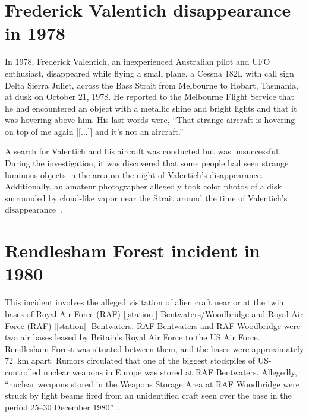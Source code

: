 \section{Frederick Valentich disappearance in 1978}

\label{2023-UFO-chapter-History--1953-2016-vd1978}

In 1978, Frederick Valentich, an inexperienced Australian pilot and UFO enthusiast, disappeared while flying a small plane, a Cessna 182L with call sign Delta Sierra Juliet, across the Bass Strait from Melbourne to Hobart, Tasmania, at dusk on October 21, 1978. He reported to the Melbourne Flight Service that he had encountered an object with a metallic shine and bright lights and that it was hovering above him. His last words were, ``That strange aircraft is hovering on top of me again [[$\ldots$]] and it's not an aircraft.''

A search for Valentich and his aircraft was conducted but was unsuccessful. During the investigation, it was discovered that some people had seen strange luminous objects in the area on the night of Valentich's disappearance. Additionally, an amateur photographer allegedly took color photos of a disk surrounded by cloud-like vapor near the Strait around the time of Valentich's disappearance~\cite{Isaac-1978.1021_Valentich_disappearance, Sanarov-81, Haines2000}.





\section{Rendlesham Forest incident in 1980}\label{2023-UFO-chapter-History--1953-2016-rf1980}



This incident involves the alleged visitation of alien craft near or at the twin bases of
Royal Air Force (RAF) [[station]] Bentwaters/Woodbridge and Royal Air Force (RAF) [[station]] Bentwaters.
RAF Bentwaters and RAF Woodbridge were two air bases leased by Britain's Royal Air Force to the US Air Force.
Rendlesham Forest was situated between them, and the bases were approximately 72~km apart.
Rumors circulated that one of the biggest stockpiles of US-controlled nuclear weapons in Europe was stored at RAF Bentwaters.
Allegedly, ``nuclear weapons stored in the Weapons Storage Area at RAF Woodbridge were struck by light beams
fired from an unidentified craft seen over the base in the period 25--30 December 1980''~\cite{Hill-Norton1997}.


